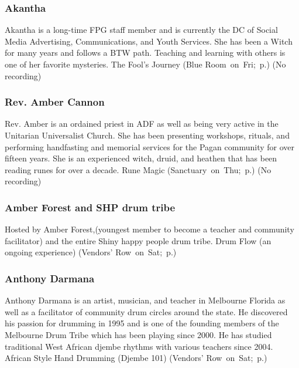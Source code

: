 
\subsubsection{Akantha} %
{  \small  Akantha is a long-time FPG staff member and is currently the DC of Social Media Advertising, Communications, and Youth Services. She has been a Witch for many years and follows a BTW path. Teaching and learning with others is one of her favorite mysteries. } %
\hspace{2em} {\footnotesize The Fool's Journey (Blue Room~on~Fri;~p.\pageref{Fri-Akantha1})}
 {\small (No recording)} 

\vspace{6pt}

\subsubsection{Rev. Amber Cannon} %
{  \small  Rev. Amber is an ordained priest in ADF as well as being very active in the Unitarian Universalist Church. She has been presenting workshops, rituals, and performing handfasting and memorial services for the Pagan community for over fifteen years. She is an experienced witch, druid, and heathen that has been reading runes for over a decade.  } %
\hspace{2em} {\footnotesize Rune Magic (Sanctuary~on~Thu;~p.\pageref{Thu-Cannon1})}
 {\small (No recording)} 

\vspace{6pt}

\subsubsection{Amber Forest and SHP drum tribe} %
{  \small  Hosted by Amber Forest,(youngest member to become a teacher and community facilitator) and the entire Shiny happy people drum tribe. } %
\hspace{2em} {\footnotesize Drum Flow (an ongoing experience) (Vendors' Row~on~Sat;~p.\pageref{Sat-Shiny1})}

\vspace{6pt}

\subsubsection{Anthony Darmana} %
{  \small  Anthony Darmana is an artist, musician, and teacher in Melbourne Florida as well as a facilitator of community drum circles around the state. He discovered his passion for drumming in 1995 and is one of the founding members of the Melbourne Drum Tribe which has been playing since 2000. He has studied traditional West African djembe rhythms with various teachers since 2004.
 } %
\hspace{2em} {\footnotesize African Style Hand Drumming (Djembe 101) (Vendors' Row~on~Sat;~p.\pageref{Sat-Darmana1})}

